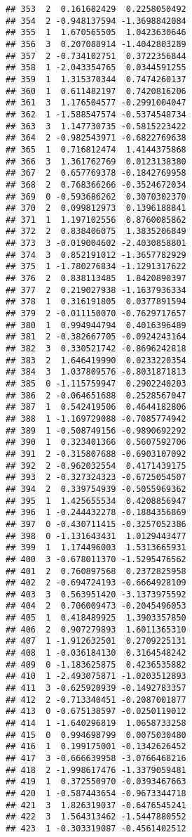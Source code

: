 \documentclass[
]{article}
\begin{document}
\begin{verbatim}
## 353  2  0.161682429  0.2258050492
## 354  2 -0.948137594 -1.3698842084
## 355  1  1.670565505  1.0423630646
## 356  3  0.207088914 -1.4042803289
## 357  2 -0.734102751  0.3722356844
## 358  1 -2.043354765  0.0344591255
## 359  1  1.315370344  0.7474260137
## 360  1  0.611482197  0.7420816206
## 361  3  1.176504577 -0.2991004047
## 362  1 -1.588547574 -0.5374548734
## 363  3  1.147730735 -0.5815223422
## 364  2 -0.982543971 -0.6822769638
## 365  1  0.716812474  1.4144375868
## 366  3  1.361762769  0.0123138380
## 367  2  0.657769378 -0.1842769958
## 368  2  0.768366266 -0.3524672034
## 369  0 -0.593686262  0.3070302370
## 370  2  0.099812973  0.1396188841
## 371  1  1.197102556  0.8760085862
## 372  2  0.838406075  1.3835206849
## 373  3 -0.019004602 -2.4030858801
## 374  3  0.852191012 -1.3657782929
## 375  1 -1.780276834 -1.1291317622
## 376  2  0.838113485  1.8420890397
## 377  2  0.219027938 -1.1637936334
## 378  1  0.316191805  0.0377891594
## 379  2 -0.011150070 -0.7629717657
## 380  1  0.994944794  0.4016396489
## 381  2 -0.382667705 -0.0924243164
## 382  3  0.330521742 -0.8696242818
## 383  2  1.646419990  0.0233220354
## 384  3  1.037809576 -0.8031871813
## 385  0 -1.115759947  0.2902240203
## 386  2 -0.064651688  0.2528567047
## 387  1  0.542419506  0.4644182806
## 388  1 -1.169729088 -0.7085774942
## 389  1 -0.508749156 -0.9890692292
## 390  1  0.323401366  0.5607592706
## 391  2 -0.315807688 -0.6903107092
## 392  2 -0.962032554  0.4171439175
## 393  2 -0.327324323 -0.6725054507
## 394  2  0.339754939 -0.5055969362
## 395  1  1.425655534  0.4208856947
## 396  1 -0.244432278 -0.1884356869
## 397  0 -0.430711415 -0.3257052386
## 398  0 -1.131643431  1.0129443477
## 399  1  1.174496003  1.5313665931
## 400  3 -0.678011370 -1.5295476562
## 401  2  0.760897568  0.2372825958
## 402  2 -0.694724193 -0.6664928109
## 403  3  0.563951420 -3.1373975592
## 404  2  0.706009473 -0.2045496053
## 405  1  0.418489925  1.3903357850
## 406  2  0.907279893  1.6011365310
## 407  1 -1.912632501  0.2709225131
## 408  1 -0.036184130  0.3164548242
## 409  0 -1.183625875  0.4236535882
## 410  1 -2.493075871 -1.0203512893
## 411  3 -0.625920939 -0.1492783357
## 412  2 -0.713340451 -0.2087001877
## 413  0 -0.675138597 -0.0250119012
## 414  1 -1.640296819  1.0658733258
## 415  0  0.994698799  0.0075030480
## 416  1  0.199175001 -0.1342626452
## 417  3 -0.666639958 -3.0766468216
## 418  2 -1.998617476 -1.3379059481
## 419  1  0.372550970 -0.0393467663
## 420  1 -0.587443654 -0.9673344718
## 421  3  1.826319037 -0.6476545241
## 422  3  1.564313462 -1.5447880552
## 423  1 -0.303319087 -0.4561402512

\end{verbatim}
\end{document}

